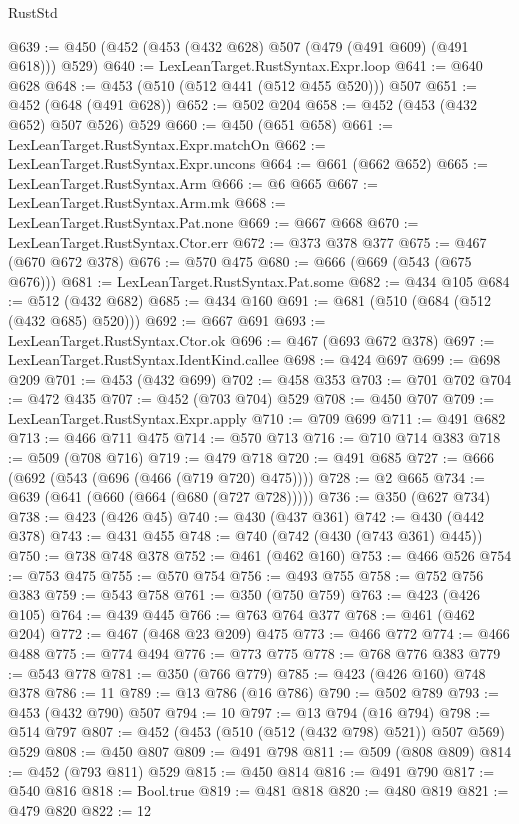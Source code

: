 \begin{lexlean}{RustStd}
\begin{coremodule}
{\begin{coremodule}
{{{{{{{{{{{{@639 := @450 (@452 (@453 (@432 @628) @507 (@479 (@491 @609) (@491 @618))) @529)
@640 := LexLeanTarget.RustSyntax.Expr.loop
@641 := @640 @628
@648 := @453 (@510 (@512 @441 (@512 @455 @520))) @507
@651 := @452 (@648 (@491 @628))
@652 := @502 @204
@658 := @452 (@453 (@432 @652) @507 @526) @529
@660 := @450 (@651 @658)
@661 := LexLeanTarget.RustSyntax.Expr.matchOn
@662 := LexLeanTarget.RustSyntax.Expr.uncons
@664 := @661 (@662 @652)
@665 := LexLeanTarget.RustSyntax.Arm
@666 := @6 @665
@667 := LexLeanTarget.RustSyntax.Arm.mk
@668 := LexLeanTarget.RustSyntax.Pat.none
@669 := @667 @668
@670 := LexLeanTarget.RustSyntax.Ctor.err
@672 := @373 @378 @377
@675 := @467 (@670 @672 @378)
@676 := @570 @475
@680 := @666 (@669 (@543 (@675 @676)))
@681 := LexLeanTarget.RustSyntax.Pat.some
@682 := @434 @105
@684 := @512 (@432 @682)
@685 := @434 @160
@691 := @681 (@510 (@684 (@512 (@432 @685) @520)))
@692 := @667 @691
@693 := LexLeanTarget.RustSyntax.Ctor.ok
@696 := @467 (@693 @672 @378)
@697 := LexLeanTarget.RustSyntax.IdentKind.callee
@698 := @424 @697
@699 := @698 @209
@701 := @453 (@432 @699)
@702 := @458 @353
@703 := @701 @702
@704 := @472 @435
@707 := @452 (@703 @704) @529
@708 := @450 @707
@709 := LexLeanTarget.RustSyntax.Expr.apply
@710 := @709 @699
@711 := @491 @682
@713 := @466 @711 @475
@714 := @570 @713
@716 := @710 @714 @383
@718 := @509 (@708 @716)
@719 := @479 @718
@720 := @491 @685
@727 := @666 (@692 (@543 (@696 (@466 (@719 @720) @475))))
@728 := @2 @665
@734 := @639 (@641 (@660 (@664 (@680 (@727 @728)))))
@736 := @350 (@627 @734)
@738 := @423 (@426 @45)
@740 := @430 (@437 @361)
@742 := @430 (@442 @378)
@743 := @431 @455
@748 := @740 (@742 (@430 (@743 @361) @445))
@750 := @738 @748 @378
@752 := @461 (@462 @160)
@753 := @466 @526
@754 := @753 @475
@755 := @570 @754
@756 := @493 @755
@758 := @752 @756 @383
@759 := @543 @758
@761 := @350 (@750 @759)
@763 := @423 (@426 @105)
@764 := @439 @445
@766 := @763 @764 @377
@768 := @461 (@462 @204)
@772 := @467 (@468 @23 @209) @475
@773 := @466 @772
@774 := @466 @488
@775 := @774 @494
@776 := @773 @775
@778 := @768 @776 @383
@779 := @543 @778
@781 := @350 (@766 @779)
@785 := @423 (@426 @160) @748 @378
@786 := 11
@789 := @13 @786 (@16 @786)
@790 := @502 @789
@793 := @453 (@432 @790) @507
@794 := 10
@797 := @13 @794 (@16 @794)
@798 := @514 @797
@807 := @452 (@453 (@510 (@512 (@432 @798) @521)) @507 @569) @529
@808 := @450 @807
@809 := @491 @798
@811 := @509 (@808 @809)
@814 := @452 (@793 @811) @529
@815 := @450 @814
@816 := @491 @790
@817 := @540 @816
@818 := Bool.true
@819 := @481 @818
@820 := @480 @819
@821 := @479 @820
@822 := 12
}}}}}}}}}}}}
\end{coremodule}}
\end{coremodule}
\end{lexlean}
